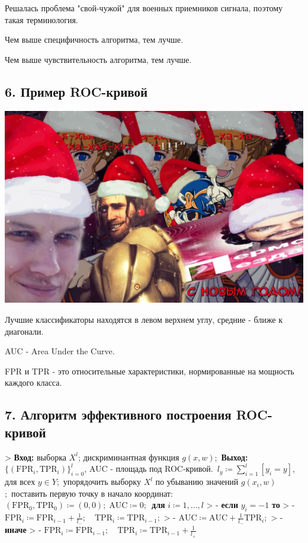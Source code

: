 Решалась проблема "свой-чужой" для военных приемников сигнала, поэтому
такая терминология.

Чем выше специфичность алгоритма, тем лучше.

Чем выше чувствительность алгоритма, тем лучше.

\subsection{6. Пример ROC-кривой}

\includegraphics[scale=0.3]{figures/samplefigure.jpg}

Лучшие классификаторы находятся в левом верхнем углу, средние - ближе к
диагонали.

AUC - Area Under the Curve.

FPR и TPR - это относительные характеристики, нормированные на мощность
каждого класса.

\subsection{7. Алгоритм эффективного построения ROC-кривой}

> \textbf{Вход:} выборка $X^l$; дискриминантная функция $g{(x, w)}$;\
\textbf{Выход:} ${\lbrace {(\text{FPR}_i, \text{TPR}_i)} \rbrace}_{i=0}^{l}$, AUC - площадь под ROC-кривой.\
$l_y \coloneqq \sum_{i=1}^{l}{\left[ y_i = y \right]}$, для всех $y \in Y$;\
упорядочить выборку $X^l$ по убыванию значений $g{(x_i, w)}$;\
поставить первую точку в начало координат:\
${(\text{FPR}_0, \text{TPR}_0)} \coloneqq {(0, 0)}; \; \text{AUC} \coloneqq 0;$\
\textbf{для} $i \coloneqq 1, \ldots, l$
> - \textbf{если} $y_i = -1$ \textbf{то}
>   - $\text{FPR}_i \coloneqq \text{FPR}_{i-1} + \frac{1}{l_{-}}; \quad \text{TPR}_i \coloneqq \text{TPR}_{i - 1};$
>   - $\text{AUC} \coloneqq \text{AUC} + \frac{1}{l_{-}}\text{TPR}_i;$
> - \textbf{иначе}
>   - $\text{FPR}_i \coloneqq \text{FPR}_{i-1}; \quad \text{TPR}_i \coloneqq \text{TPR}_{i-1} + \frac{1}{l_{+}}$

